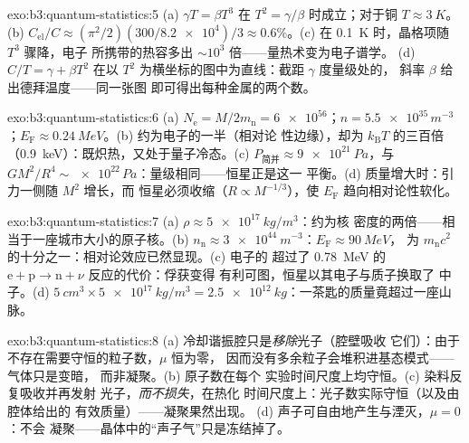 \begin{solution}{exo:b3:quantum-statistics:5}
(a) $\gamma T = \beta T^3$ 在 $T^2 = \gamma/\beta$ 时成立；对于铜
$T \approx \qty{3}{K}$。(b) $C_{\text{el}}/C \approx
(\pi^2/2)(300/\num{8.2e4})/3 \approx 0.6\%$。(c) 在 \qty{0.1}{K}
时，晶格项随 $T^3$ 骤降，电子
所携带的热容多出 $\sim10^3$ 倍——量热术变为电子谱学。
(d) $C/T = \gamma + \beta T^2$ 在以
$T^2$ 为横坐标的图中为直线：截距 $\gamma$ 度量级处的，
斜率 $\beta$ 给出德拜温度——同一张图
即可得出每种金属的两个数。
\end{solution}

\begin{solution}{exo:b3:quantum-statistics:6}
(a) $N_{\text{e}} = M/2m_{\text{n}} = \num{6e56}$；$n =
\num{5.5e35}\,\unit{m^{-3}}$；$E_{\text{F}} \approx
\qty{0.24}{MeV}$。(b) 约为电子的一半（相对论
性边缘），却为 $k_{\text{B}}T$ 的三百倍
（\qty{0.9}{keV}）：既炽热，又处于量子冷态。(c)
$P_{\text{简并}} \approx \qty{9e21}{Pa}$，与 $GM^2/R^4 \sim
\num{e22}\,\unit{Pa}$：量级相同——恒星正是这一
平衡。(d) 质量增大时：引力一侧随 $M^2$ 增长，而
恒星必须收缩（$R \propto M^{-1/3}$），使 $E_{\text{F}}$
趋向相对论性软化。
\end{solution}

\begin{solution}{exo:b3:quantum-statistics:7}
(a) $\rho \approx \qty{5e17}{kg/m^3}$：约为核
密度的两倍——相当于一座城市大小的原子核。(b) $n_{\text{n}}
\approx \qty{3e44}{m^{-3}}$：$E_{\text{F}} \approx \qty{90}{MeV}$，
为 $m_{\text{n}}c^2$ 的十分之一：相对论效应已然显现。(c) 电子的
超过了 \qty{0.78}{MeV} 的
$\text{e} + \text{p} \to \text{n} + \nu$ 反应的代价：俘获变得
有利可图，恒星以其电子与质子换取了
中子。(d) $\qty{5}{cm^3} \times \qty{5e17}{kg/m^3} =
\qty{2.5e12}{kg}$：一茶匙的质量竟超过一座山脉。
\end{solution}

\begin{solution}{exo:b3:quantum-statistics:8}
(a) 冷却谐振腔只是\emph{移除}光子（腔壁吸收
它们）：由于不存在需要守恒的粒子数，$\mu$ 恒为零，
因而没有多余粒子会堆积进基态模式——气体只是变暗，
而非凝聚。(b) 原子数在每个
实验时间尺度上均守恒。(c) 染料反复吸收并再发射
光子，\emph{而不损失}，在热化
时间尺度上：光子数实际守恒（以及由腔体给出的
有效质量）——凝聚果然出现。
(d) 声子可自由地产生与湮灭，$\mu = 0$：不会
凝聚——晶体中的“声子气”只是冻结掉了。
\end{solution}

